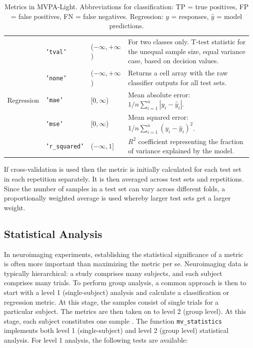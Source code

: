 \documentclass[utf8]{frontiersSCNS} %
\newcommand{\ttt}[1]{\texttt{#1}}
\begin{document}
\begin{table}[]
\begin{tabularx}{\textwidth}{lllX}
&\ttt{'tval'} & ($-\infty,+\infty$) & For two classes only. T-test statistic for the unequal sample size, equal variance case, based on decision values.\\
&\ttt{'none'} & ($-\infty,+\infty$) & Returns a cell array with the raw classifier outputs for all test sets.\\\hline
Regression & \ttt{'mae'}  & [$0,\infty$) &  Mean absolute error: $1/n \sum_{i=1}^n|y_i - \hat{y}_i|$.\\
& \ttt{'mse'}  & [$0,\infty$) &  Mean squared error: $1/n \sum_{i=1}^n(y_i - \hat{y}_i)^2$.\\
& \ttt{'r\_squared'} & ($-\infty,1$] &  $R^2$ coefficient representing the fraction of variance explained by the model.\\
\hline
\end{tabularx}
\caption{Metrics in MVPA-Light. Abbreviations for classification: TP = true positives, FP = false positives, FN = false negatives. Regression: $y$ = responses, $\hat{y}$ = model predictions.}
\label{tab:metrics}
\end{table}

If cross-validation is used then the metric is initially calculated for each test set in each repetition separately. It is then averaged across test sets and repetitions. Since the number of samples in a test set can vary across different folds, a proportionally weighted average is used whereby larger test sets get a larger weight.

\subsection{Statistical Analysis}\label{sec:statistics}

In neuroimaging experiments, establishing the statistical significance of a metric is often more important than maximizing the metric per se. Neuroimaging data is typically hierarchical: a study comprises many subjects, and each subject comprises many trials. To perform group analysis, a common approach is then to start with a level 1 (single-subject) analysis and calculate a classification or regression metric. At this stage, the samples consist of single trials for a particular subject. The metrics are then taken on to level 2 (group level). At this stage, each subject constitutes one sample  \citep{Mumford2007ModelingData}.
The function \ttt{mv\_statistics} implements both level 1 (single-subject) and level 2 (group level) statistical analysis. For level 1 analysis, the following tests are available:
\end{document}
